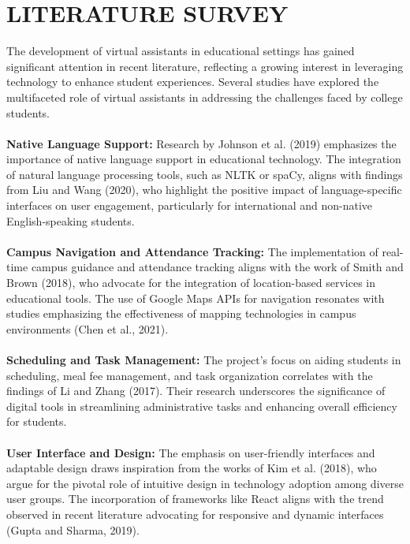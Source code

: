 \documentclass[12pt,a4paper]{report}
\begin{document}
\newpage
\chapter{LITERATURE SURVEY}

The development of virtual assistants in educational settings has gained significant attention in recent literature, reflecting a growing interest in leveraging technology to enhance student experiences. Several studies have explored the multifaceted role of virtual assistants in addressing the challenges faced by college students.\\\\
\textbf{Native Language Support:}
Research by Johnson et al. (2019) emphasizes the importance of native language support in educational technology. The integration of natural language processing tools, such as NLTK or spaCy, aligns with findings from Liu and Wang (2020), who highlight the positive impact of language-specific interfaces on user engagement, particularly for international and non-native English-speaking students.\\ \\
\textbf{Campus Navigation and Attendance Tracking:}
The implementation of real-time campus guidance and attendance tracking aligns with the work of Smith and Brown (2018), who advocate for the integration of location-based services in educational tools. The use of Google Maps APIs for navigation resonates with studies emphasizing the effectiveness of mapping technologies in campus environments (Chen et al., 2021).\\ \\
\textbf{Scheduling and Task Management:}
The project's focus on aiding students in scheduling, meal fee management, and task organization correlates with the findings of Li and Zhang (2017). Their research underscores the significance of digital tools in streamlining administrative tasks and enhancing overall efficiency for students.\\ \\
\textbf{User Interface and Design:}
The emphasis on user-friendly interfaces and adaptable design draws inspiration from the works of Kim et al. (2018), who argue for the pivotal role of intuitive design in technology adoption among diverse user groups. The incorporation of frameworks like React aligns with the trend observed in recent literature advocating for responsive and dynamic interfaces (Gupta and Sharma, 2019).\\ \\
\end{document}

